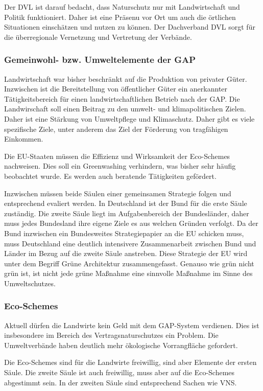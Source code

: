 \documentclass[11pt]{scrbook}
\begin{document}
Der \ac{DVL} ist darauf bedacht, dass Naturschutz nur mit Landwirtschaft und Politik funktioniert.
Daher ist eine Präsenu vor Ort um auch die örtlichen Situationen einschätzen und nutzen zu können.
Der Dachverband \ac{DVL} sorgt für die überregionale Vernetzung und Vertretung der Verbände.

\subsubsection{Gemeinwohl- bzw. Umweltelemente der GAP}
Landwirtschaft war bisher beschränkt auf die Produktion von privater Güter.
Inzwischen ist die Bereitstellung von öffentlicher Güter ein anerkannter Tätigkeitsbereich für einen landwirtschaftlichen Betrieb nach der \ac{GAP}.
Die Landwirschaft soll einen Beitrag zu den umwelt- und klimapolitischen Zielen.
Daher ist eine Stärkung von Umweltpflege und Klimaschutz.
Daher gibt es viele spezifische Ziele, unter anderem das Ziel der Förderung von tragfähigen Einkommen.

Die \ac{EU}-Staaten müssen die Effizienz und Wirksamkeit der Eco-Schemes nachweisen.
Dies soll ein Greenwashing verhindern, was bisher sehr häufig beobachtet wurde.
Es werden auch beratende Tätigkeiten gefördert.

Inzwischen müssen beide Säulen einer gemeinsamen Strategie folgen und entsprechend evaliert werden.
In Deutschland ist der Bund für die erste Säule zuständig.
Die zweite Säule liegt im Aufgabenbereich der Bundesländer, daher muss jedes Bundesland ihre eigene Ziele es aus welchen Gründen verfolgt.
Da der Bund inzwischen ein Bundesweites Strategiepapier an die \ac{EU} schicken muss, muss Deutschland eine deutlich intensivere Zusammenarbeit zwischen Bund und Länder im Bezug auf die zweite Säule anstreben.
Diese Strategie der \ac{EU} wird unter dem Begriff \glqq Grüne Architektur\grqq{} zusammengefasst.
Genauso wie grün nicht grün ist, ist nicht jede \glqq grüne\grqq{} Maßnahme eine sinnvolle Maßnahme im Sinne des Umweltschutzes.

\subsubsection{Eco-Schemes}
Aktuell dürfen die Landwirte kein Geld mit dem \ac{GAP}-System verdienen.
Dies ist insbesondere im Bereich des Vertragsnaturschutzes ein Problem.
Die Umweltverbände haben deutlich mehr ökologische Vorrangfläche gefordert.

Die Eco-Schemes sind für die Landwirte freiwillig, sind aber Elemente der ersten Säule.
Die zweite Säule ist auch freiwillig, muss aber auf die Eco-Schemes abgestimmt sein.
In der zweiten Säule sind entsprechend Sachen wie \ac{VNS}.
\end{document}
